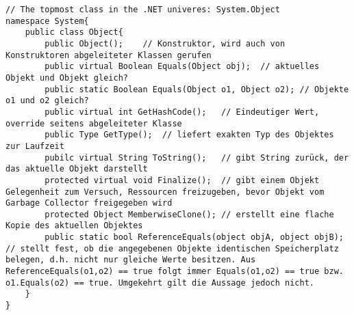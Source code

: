 \begin{lstlisting}[language={[Sharp]C}]
// The topmost class in the .NET univeres: System.Object
namespace System{
	public class Object{
		public Object();	// Konstruktor, wird auch von Konstruktoren abgeleiteter Klassen gerufen
		public virtual Boolean Equals(Object obj);	// aktuelles Objekt und Objekt gleich?
		public static Boolean Equals(Object o1, Object o2); // Objekte o1 und o2 gleich?
		public virtual int GetHashCode();	// Eindeutiger Wert, override seitens abgeleiteter Klasse
		public Type GetType();	// liefert exakten Typ des Objektes zur Laufzeit
		pubilc virtual String ToString();	// gibt String zurück, der das aktuelle Objekt darstellt
		protected virtual void Finalize();	// gibt einem Objekt Gelegenheit zum Versuch, Ressourcen freizugeben, bevor Objekt vom Garbage Collector freigegeben wird
		protected Object MemberwiseClone();	// erstellt eine flache Kopie des aktuellen Objektes
		public static bool ReferenceEquals(object objA, object objB);	// stellt fest, ob die angegebenen Objekte identischen Speicherplatz belegen, d.h. nicht nur gleiche Werte besitzen. Aus ReferenceEquals(o1,o2) == true folgt immer Equals(o1,o2) == true bzw. o1.Equals(o2) == true. Umgekehrt gilt die Aussage jedoch nicht.
	}
}
\end{lstlisting}



